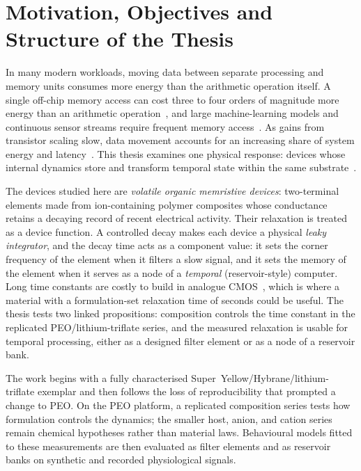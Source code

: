 \documentclass[12pt, twoside]{report}
\begin{document}
\fi

\chapter*{Motivation, Objectives and Structure of the Thesis}
\label{sec:scope_objectives}


In many modern workloads, moving data between separate processing and memory units consumes more energy than the arithmetic operation itself. A single off-chip memory access can cost three to four orders of magnitude more energy than an arithmetic operation~\cite{Horowitz2014}, and large machine-learning models and continuous sensor streams require frequent memory access~\cite{LeCun2015}. As gains from transistor scaling slow, data movement accounts for an increasing share of system energy and latency~\cite{Hennessy2019}. This thesis examines one physical response: devices whose internal dynamics store and transform temporal state within the same substrate~\cite{Mead1990,Tanaka2019}.

The devices studied here are \emph{volatile organic memristive devices}: two-terminal elements made from ion-containing polymer composites whose conductance retains a decaying record of recent electrical activity. Their relaxation is treated as a device function. A controlled decay makes each device a physical \emph{leaky integrator}, and the decay time acts as a component value: it sets the corner frequency of the element when it filters a slow signal, and it sets the memory of the element when it serves as a node of a \emph{temporal} (reservoir-style) computer. Long time constants are costly to build in analogue CMOS~\cite{IndiveriSandamirskaya2019}, which is where a material with a formulation-set relaxation time of seconds could be useful. The thesis tests two linked propositions: composition controls the time constant in the replicated PEO/lithium-triflate series, and the measured relaxation is usable for temporal processing, either as a designed filter element or as a node of a reservoir bank.

The work begins with a fully characterised Super~Yellow/Hybrane/lithium-triflate exemplar and then follows the loss of reproducibility that prompted a change to PEO. On the PEO platform, a replicated composition series tests how formulation controls the dynamics; the smaller host, anion, and cation series remain chemical hypotheses rather than material laws. Behavioural models fitted to these measurements are then evaluated as filter elements and as reservoir banks on synthetic and recorded physiological signals.
\end{document}

